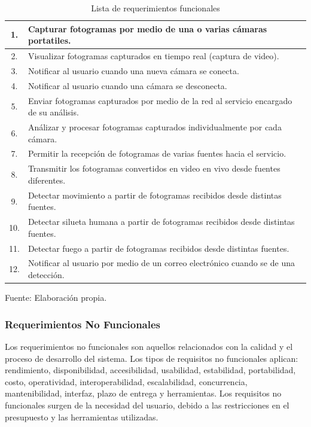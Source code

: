 \begin{table}[H]
    \caption{Lista de requerimientos funcionales }
    \label{tabla:req_funcionales}
    \begin{center}
        \begin{tabular}{ |c|l|} 
            \hline
            1. & Capturar fotogramas por medio de una o varias cámaras portatiles.\\ \hline
            2. & Visualizar fotogramas capturados en tiempo real (captura de video).\\  \hline
            3. & Notificar al usuario cuando una nueva cámara se conecta.\\  \hline
            4. & Notificar al usuario cuando una cámara se desconecta.\\  \hline
            5. & Enviar fotogramas capturados por medio de la red al servicio encargado de su análisis.\\ \hline
            6. & Análizar y procesar fotogramas capturados individualmente por cada cámara.\\  \hline
            7. & Permitir la recepción de fotogramas de varias fuentes hacia el servicio.\\ \hline
            8. & Transmitir los fotogramas convertidos en video en vivo desde fuentes diferentes.\\ \hline
            9. & Detectar movimiento a partir de fotogramas recibidos desde distintas fuentes.\\ \hline
            10. & Detectar silueta humana a partir de fotogramas recibidos desde distintas fuentes.\\ \hline
            11. & Detectar fuego a partir de fotogramas recibidos desde distintas fuentes.\\ \hline
            12. & Notificar al usuario por medio de un correo electrónico cuando se de una detección.\\ \hline
        \end{tabular}
    \end{center}
    \begin{center}
        Fuente: Elaboración propia.
    \end{center}
\end{table}

\subsubsection{Requerimientos No Funcionales}
Los requerimientos no funcionales son aquellos relacionados con la calidad y el proceso de desarrollo del sistema. Los tipos de requisitos no funcionales aplican: rendimiento, disponibilidad, accesibilidad, usabilidad, estabilidad, portabilidad, costo, operatividad, interoperabilidad, escalabilidad, concurrencia, mantenibilidad, interfaz, plazo de entrega y herramientas. Los requisitos no funcionales surgen de la necesidad del usuario, debido a las restricciones en el presupuesto y las herramientas utilizadas.\\

